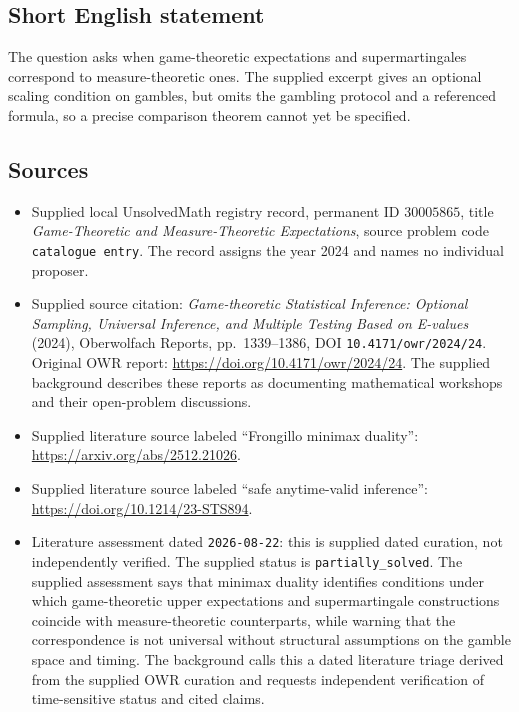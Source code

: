 \documentclass[11pt]{article}
\begin{document}
\subsection{Short English statement}
The question asks when game-theoretic expectations and supermartingales correspond to measure-theoretic ones. The supplied excerpt gives an optional scaling condition on gambles, but omits the gambling protocol and a referenced formula, so a precise comparison theorem cannot yet be specified.
\subsection{Sources}
\begin{itemize}
\item Supplied local UnsolvedMath registry record, permanent ID \(30005865\), title \emph{Game-Theoretic and Measure-Theoretic Expectations}, source problem code \texttt{catalogue entry}. The record assigns the year 2024 and names no individual proposer.
\item Supplied source citation: \emph{Game-theoretic Statistical Inference: Optional Sampling, Universal Inference, and Multiple Testing Based on E-values} (2024), Oberwolfach Reports, pp.\ 1339--1386, DOI \texttt{10.4171/owr/2024/24}. Original OWR report: \url{https://doi.org/10.4171/owr/2024/24}. The supplied background describes these reports as documenting mathematical workshops and their open-problem discussions.
\item Supplied literature source labeled ``Frongillo minimax duality'': \url{https://arxiv.org/abs/2512.21026}.
\item Supplied literature source labeled ``safe anytime-valid inference'': \url{https://doi.org/10.1214/23-STS894}.
\item Literature assessment dated \texttt{2026-08-22}: this is supplied dated curation, not independently verified. The supplied status is \texttt{partially\_solved}. The supplied assessment says that minimax duality identifies conditions under which game-theoretic upper expectations and supermartingale constructions coincide with measure-theoretic counterparts, while warning that the correspondence is not universal without structural assumptions on the gamble space and timing. The background calls this a dated literature triage derived from the supplied OWR curation and requests independent verification of time-sensitive status and cited claims.
\end{itemize}
\end{document}
